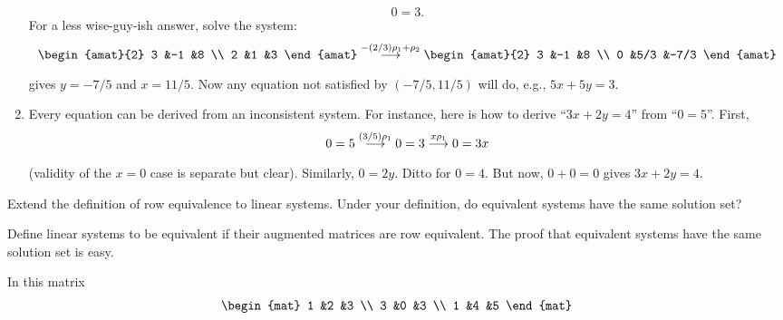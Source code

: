 \begin{exercises}
\begin{answer}
\begin{enumerate}
          \begin{equation*}
            0=3.
          \end{equation*}
          For a less wise-guy-ish answer, solve the system:
          \begin{equation*}
            \begin{amat}{2}
              3  &-1  &8  \\
              2  &1   &3
            \end{amat}
            \grstep{-(2/3)\rho_1+\rho_2}
            \begin{amat}{2}
              3  &-1  &8    \\
              0  &5/3 &-7/3
            \end{amat}
          \end{equation*}
          gives \( y=-7/5 \) and \( x=11/5 \).
          Now any equation not satisfied by \( (-7/5,11/5) \) will do,
          e.g., \( 5x+5y=3 \).
        \item Every equation can be derived from an inconsistent system.
          For instance, here is how to derive ``\( 3x+2y=4 \)'' from
          ``\( 0=5 \)''.
          First,
          \begin{equation*}
            0=5
            \mathrel{ \mathop{\longrightarrow}\limits^{(3/5)\rho_1\mathstrut}_{ \begin{subarray}{l} \relax \end{subarray}}}
            0=3
            \mathrel{ \mathop{\longrightarrow}\limits^{x\rho_1\mathstrut}_{ \begin{subarray}{l} \relax \end{subarray}}}
            0=3x
          \end{equation*}
          (validity of the \( x=0 \) case is separate but clear).
          Similarly, \( 0=2y \).
          Ditto for \( 0=4 \).
          But now, \( 0+0=0 \) gives \( 3x+2y=4 \).
     \end{enumerate}  
    \end{answer}
  \item 
    Extend the definition of row equivalence to linear systems.
    Under your definition, do equivalent systems have the same solution set?
    \cite{HoffmanKunze}
    \begin{answer}
      Define linear systems to be equivalent if their augmented
      matrices are row equivalent.
      The proof that equivalent systems have the same solution set is easy.  
    \end{answer}
  \recommended \item 
    In this matrix
    \begin{equation*}
      \begin{mat}
        1  &2  &3  \\
        3  &0  &3  \\
        1  &4  &5

\end{mat}
\end{equation*}
\end{exercises}
